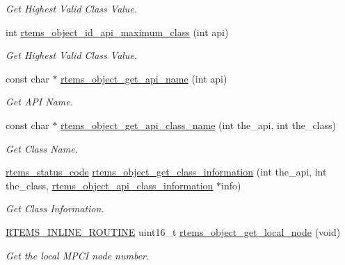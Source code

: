 \begin{DoxyCompactItemize}
\begin{DoxyCompactList}\small\item\em Get Highest Valid Class Value. \end{DoxyCompactList}\item 
int \mbox{\hyperlink{group__ClassicClassInfo_gadacfe7b55a0ad524c8a07a64a6bdb1a7}{rtems\+\_\+object\+\_\+id\+\_\+api\+\_\+maximum\+\_\+class}} (int api)
\begin{DoxyCompactList}\small\item\em Get Highest Valid Class Value. \end{DoxyCompactList}\item 
const char $\ast$ \mbox{\hyperlink{group__ClassicClassInfo_gaa3fcf442c9bec4b06ea11721d1001c3d}{rtems\+\_\+object\+\_\+get\+\_\+api\+\_\+name}} (int api)
\begin{DoxyCompactList}\small\item\em Get A\+PI Name. \end{DoxyCompactList}\item 
const char $\ast$ \mbox{\hyperlink{group__ClassicClassInfo_gab45ee8ee4d1e17a20e264aaef167430e}{rtems\+\_\+object\+\_\+get\+\_\+api\+\_\+class\+\_\+name}} (int the\+\_\+api, int the\+\_\+class)
\begin{DoxyCompactList}\small\item\em Get Class Name. \end{DoxyCompactList}\item 
\mbox{\hyperlink{group__ClassicStatus_ga545d41846817eaba6143d52ee4d9e9fe}{rtems\+\_\+status\+\_\+code}} \mbox{\hyperlink{group__ClassicClassInfo_gae8ffdf2a3cfe0e716ebfd4a3eb1bfece}{rtems\+\_\+object\+\_\+get\+\_\+class\+\_\+information}} (int the\+\_\+api, int the\+\_\+class, \mbox{\hyperlink{structrtems__object__api__class__information}{rtems\+\_\+object\+\_\+api\+\_\+class\+\_\+information}} $\ast$info)
\begin{DoxyCompactList}\small\item\em Get Class Information. \end{DoxyCompactList}\item 
\mbox{\hyperlink{group__RTEMSScoreBaseDefs_gac216239df231d5dbd15e3520b0b9313f}{R\+T\+E\+M\+S\+\_\+\+I\+N\+L\+I\+N\+E\+\_\+\+R\+O\+U\+T\+I\+NE}} uint16\+\_\+t \mbox{\hyperlink{group__ClassicClassInfo_ga62c21de7d0b7487bba7ebd0ecc11edb3}{rtems\+\_\+object\+\_\+get\+\_\+local\+\_\+node}} (void)
\begin{DoxyCompactList}\small\item\em Get the local M\+P\+CI node number. \end{DoxyCompactList}\end{DoxyCompactItemize}


